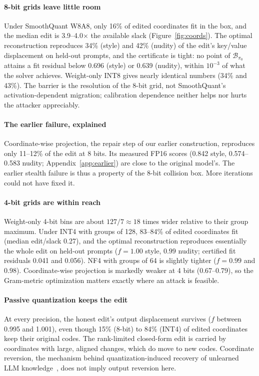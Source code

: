 \documentclass[conference]{IEEEtran}
\begin{document}
\paragraph{8-bit grids leave little room}
Under SmoothQuant W8A8, only 16\% of edited coordinates fit in the box, and the
median edit is 3.9--4.0$\times$ the available slack (Figure~\ref{fig:coords}). The
optimal reconstruction reproduces 34\% (style) and 42\% (nudity) of the edit's
key/value displacement on held-out prompts, and the certificate is tight: no point of
$\mathcal{B}_{\pi_0}$ attains a fit residual below 0.696 (style) or 0.639 (nudity),
within $10^{-3}$ of what the solver achieves. Weight-only INT8 gives nearly identical numbers (34\% and 43\%). The barrier
is the resolution of the 8-bit grid, not SmoothQuant's activation-dependent
migration; calibration dependence neither helps nor hurts the attacker appreciably.

\paragraph{The earlier failure, explained}
Coordinate-wise projection, the repair step of our earlier construction, reproduces
only 11--12\% of the edit at 8 bits. Its measured FP16 scores (0.842 style, 0.574--0.583
nudity; Appendix~\ref{app:earlier}) are close to the original model's. The earlier
stealth failure is thus a property of the 8-bit collision box. More iterations could
not have fixed it.

\paragraph{4-bit grids are within reach}
Weight-only 4-bit bins are about $127/7\approx18$ times wider relative to their
group maximum. Under INT4 with groups of 128, 83--84\% of edited coordinates fit
(median edit/slack 0.27), and the optimal reconstruction reproduces essentially the whole
edit on held-out prompts ($f=1.00$ style, $0.99$ nudity; certified fit residuals
0.041 and 0.056). NF4 with groups of 64 is slightly tighter ($f=0.99$ and $0.98$).
Coordinate-wise projection is markedly weaker at 4 bits (0.67--0.79), so the
Gram-metric optimization matters exactly where an attack is feasible.

\paragraph{Passive quantization keeps the edit}
At every precision, the honest edit's output displacement survives
($f$ between 0.995 and 1.001), even though 15\% (8-bit) to 84\% (INT4) of edited
coordinates keep their original codes. The rank-limited closed-form edit is carried
by coordinates with large, aligned changes, which do move to new codes. Coordinate
reversion, the mechanism behind quantization-induced recovery of unlearned LLM
knowledge~\cite{zhang2025}, does not imply output reversion here.
\end{document}
